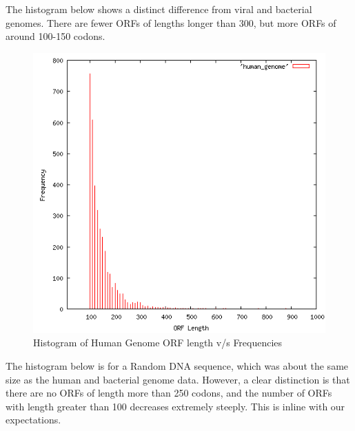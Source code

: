 \documentclass{article}
\begin{document}
The histogram below shows a distinct difference from viral and bacterial genomes. There are fewer ORFs of lengths longer than 300, but more ORFs of around 100-150 codons.
\begin{figure}[htp]
\centering
\includegraphics[scale=0.5]{human_genome.png}
\caption{Histogram of Human Genome ORF length v/s Frequencies}\label{fig:fs}
\end{figure}
\clearpage
The histogram below is for a Random DNA sequence, which was about the same size as the human and bacterial genome data. However, a clear distinction is that there are no ORFs of length more than 250 codons, and the number of ORFs with length greater than 100 decreases extremely steeply. This is inline with our expectations.
\end{document}
